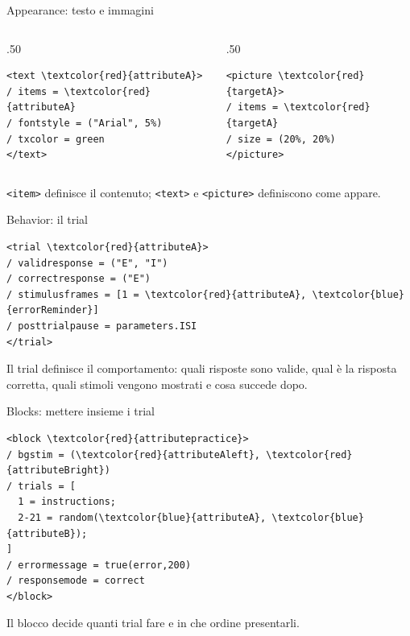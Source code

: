 \documentclass[compress]{beamer}
\begin{document}
\begin{frame}[fragile]{Appearance: testo e immagini}
\begin{columns}[T]
\begin{column}{.50\linewidth}
\begin{Verbatim}[commandchars=\\\{\}]
<text \textcolor{red}{attributeA}>
/ items = \textcolor{red}{attributeA}
/ fontstyle = ("Arial", 5%)
/ txcolor = green
</text>
\end{Verbatim}
\end{column}
\begin{column}{.50\linewidth}
\begin{Verbatim}[commandchars=\\\{\}]
<picture \textcolor{red}{targetA}>
/ items = \textcolor{red}{targetA}
/ size = (20%, 20%)
</picture>
\end{Verbatim}
\end{column}
\end{columns}

\vspace{4mm}
\centering
\texttt{<item>} definisce il contenuto; \texttt{<text>} e \texttt{<picture>} definiscono come appare.
\end{frame}

\begin{frame}[fragile]{Behavior: il trial}
\begin{small}
\begin{Verbatim}[commandchars=\\\{\}]
<trial \textcolor{red}{attributeA}>
/ validresponse = ("E", "I")
/ correctresponse = ("E")
/ stimulusframes = [1 = \textcolor{red}{attributeA}, \textcolor{blue}{errorReminder}]
/ posttrialpause = parameters.ISI
</trial>
\end{Verbatim}
\end{small}

\vspace{3mm}
Il trial definisce il comportamento: quali risposte sono valide, qual è la risposta corretta, quali stimoli vengono mostrati e cosa succede dopo.
\end{frame}

\begin{frame}[fragile]{Blocks: mettere insieme i trial}
\begin{small}
\begin{Verbatim}[commandchars=\\\{\}]
<block \textcolor{red}{attributepractice}>
/ bgstim = (\textcolor{red}{attributeAleft}, \textcolor{red}{attributeBright})
/ trials = [
  1 = instructions;
  2-21 = random(\textcolor{blue}{attributeA}, \textcolor{blue}{attributeB});
]
/ errormessage = true(error,200)
/ responsemode = correct
</block>
\end{Verbatim}
\end{small}

\vspace{2mm}
Il blocco decide quanti trial fare e in che ordine presentarli.
\end{frame}
\end{document}
